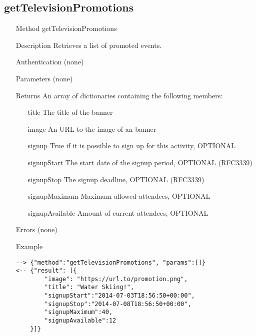 \documentclass[a4paper]{scrreprt}
\begin{document}
\clearpage

\subsection{getTelevisionPromotions}
\begin{enumerate}
\item[Method] getTelevisionPromotions
\item[Description] Retrieves a list of promoted events.
\item[Authentication] (none)
\item[Parameters] (none)
\item[Returns] An array of dictionaries containing the following members:
\begin{enumerate}
    \item[title] The title of the banner
	\item[image] An URL to the image of an banner
    \item[signup] True if it is possible to sign up for this activity, OPTIONAL
    \item[signupStart] The start date of the signup period, OPTIONAL (RFC3339)
    \item[signupStop] The signup deadline, OPTIONAL (RFC3339)
    \item[signupMaximum] Maximum allowed attendees, OPTIONAL
    \item[signupAvailable] Amount of current attendees, OPTIONAL
    \end{enumerate}
\item[Errors] (none)
\item[Example]
\begin{lstlisting}
--> {"method":"getTelevisionPromotions", "params":[]}
<-- {"result": [{
        "image": "https://url.to/promotion.png",
        "title": "Water Skiing!",
        "signupStart":"2014-07-03T18:56:50+00:00",
        "signupStop":"2014-07-08T18:56:50+00:00",
        "signupMaximum":40,
        "signupAvailable":12
    }]}
\end{lstlisting}
\end{enumerate}
\clearpage
\end{document}
